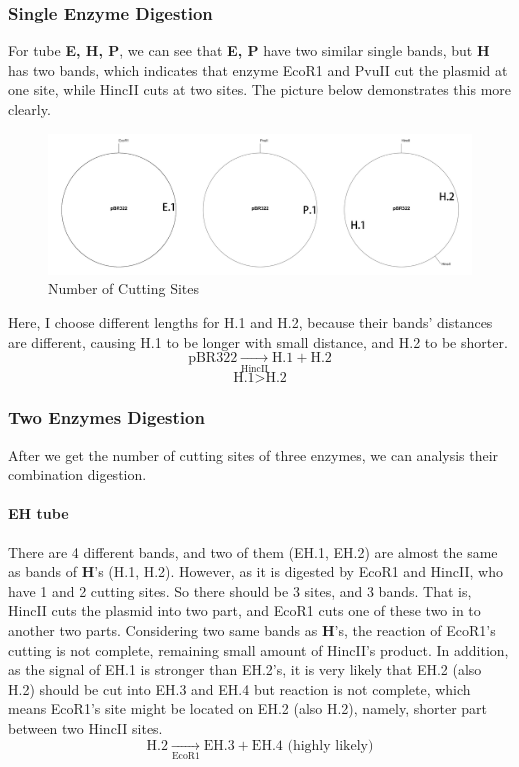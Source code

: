 \documentclass{article}
\begin{document}
            \subsubsection{Single Enzyme Digestion}
                For tube \textbf{E, H, P}, we can see that \textbf{E, P} have two similar single bands, but \textbf{H} has two bands, which indicates that enzyme EcoR1 and PvuII cut the plasmid at one site, while HincII cuts at two sites. The picture below demonstrates this more clearly.
                \begin{figure}[H]
                    \centering
                    \includegraphics[width = 0.9\linewidth]{../Data/Plasmid/single.png}
                    \caption{Number of Cutting Sites}
                    \label{single.cut}
                \end{figure}
                Here, I choose different lengths for H.1 and H.2, because their bands' distances are different, causing H.1 to be longer with small distance, and H.2 to be shorter.
                $$\text{pBR322}\underset{\text{HincII}}{\rightarrow}\text{H.1} + \text{H.2}$$
                $$\text{H.1} > \text{H.2}$$

            \subsubsection{Two Enzymes Digestion}
                After we get the number of cutting sites of three enzymes, we can analysis their combination digestion.

                \paragraph{\textbf{EH} tube} There are 4 different bands, and two of them (EH.1, EH.2) are almost the same as bands of \textbf{H}'s (H.1, H.2). However, as it is digested by EcoR1 and HincII, who have 1 and 2 cutting sites. So there should be 3 sites, and 3 bands. That is, HincII cuts the plasmid into two part, and EcoR1 cuts one of these two in to another two parts. Considering two same bands as \textbf{H}'s, the reaction of EcoR1's cutting is not complete, remaining small amount of HincII's product. In addition, as the signal of EH.1 is stronger than EH.2's, it is very likely that EH.2 (also H.2) should be cut into EH.3 and EH.4 but reaction is not complete, which means EcoR1's site might be located on EH.2 (also H.2), namely, shorter part between two HincII sites.
                $$\text{H.2} \underset{\text{EcoR1}}{\rightarrow}\text{EH.3} + \text{EH.4}\text{ (highly likely)}$$
\end{document}
